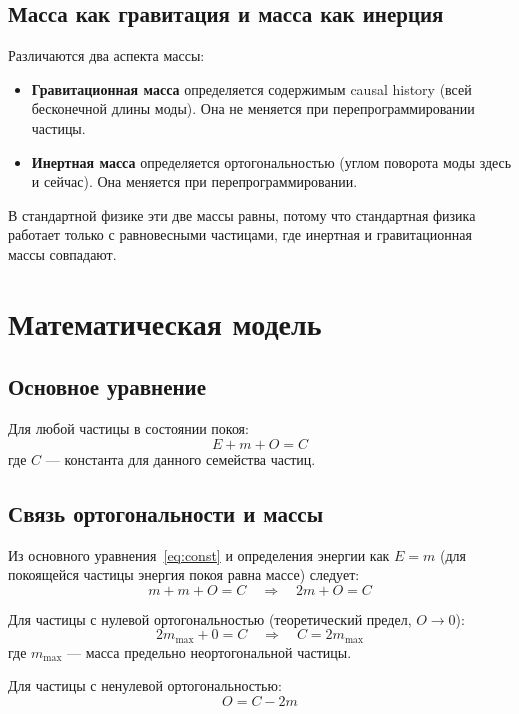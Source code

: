 \documentclass[12pt,a4paper]{article}
\begin{document}
\subsection{Масса как гравитация и масса как инерция}
Различаются два аспекта массы:
\begin{itemize}
    \item \textbf{Гравитационная масса} определяется содержимым causal history (всей бесконечной длины моды). Она не меняется при перепрограммировании частицы.
    \item \textbf{Инертная масса} определяется ортогональностью (углом поворота моды здесь и сейчас). Она меняется при перепрограммировании.
\end{itemize}

В стандартной физике эти две массы равны, потому что стандартная физика работает только с равновесными частицами, где инертная и гравитационная массы совпадают.

\section{Математическая модель}

\subsection{Основное уравнение}
Для любой частицы в состоянии покоя:
\begin{equation}
    E + m + O = C
    \label{eq:const}
\end{equation}
где $C$ --- константа для данного семейства частиц.

\subsection{Связь ортогональности и массы}
Из основного уравнения~\eqref{eq:const} и определения энергии как $E = m$ (для покоящейся частицы энергия покоя равна массе) следует:
\begin{equation}
    m + m + O = C \quad \Rightarrow \quad 2m + O = C
    \label{eq:2mplusO}
\end{equation}

Для частицы с нулевой ортогональностью (теоретический предел, $O \to 0$):
\begin{equation}
    2m_{\max} + 0 = C \quad \Rightarrow \quad C = 2m_{\max}
\end{equation}
где $m_{\max}$ --- масса предельно неортогональной частицы.

Для частицы с ненулевой ортогональностью:
\begin{equation}
    O = C - 2m
    \label{eq:OfromC}
\end{equation}
\end{document}
